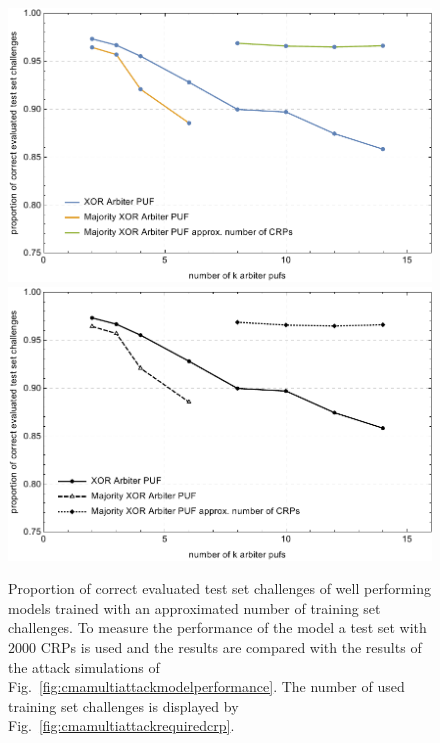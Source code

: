 \begin{figure}[ht]
\ifx{}\undefined
{}
\else
	\if{}
	\centering
	\includegraphics[width=1.00\textwidth]{images/xor-cma-attack-approx.pdf}
	\else
	\includegraphics[width=1.00\textwidth]{images/xor-cma-attack-approx_mono.pdf}
	\fi
\fi
\caption[Proportion of correct evaluated test set challenges for Majority \acs{XOR} \puf models with approximated required number of training set challenges]{Proportion of correct evaluated test set challenges of well performing models trained with an approximated number of training set challenges. To measure the performance of the model a test set with $2000$ \acp{CRP} is used and the results are compared with the results of the attack simulations of Fig.\ \ref{fig:cmamultiattackmodelperformance}. The number of used training set challenges is displayed by Fig.\ \ref{fig:cmamultiattackrequiredcrp}.}
\label{fig:cmamultiattackmvmodelperformance}
\end{figure}

